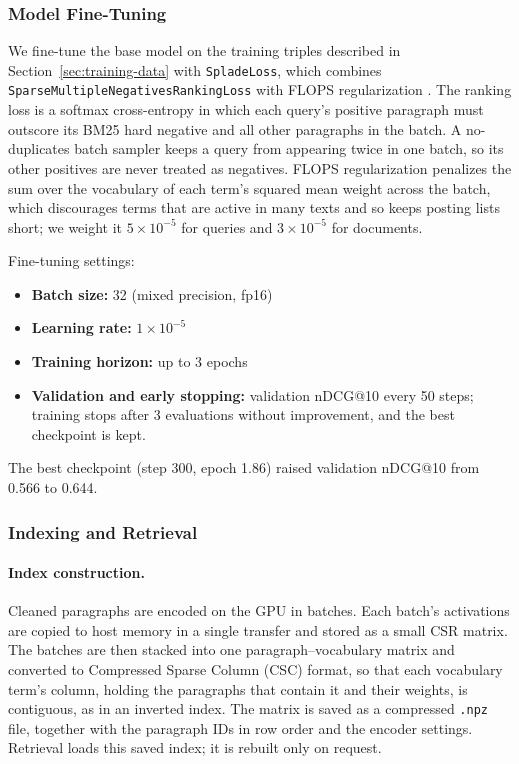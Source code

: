 \documentclass[sigconf,nonacm]{acmart}
\begin{document}
\subsubsection{Model Fine-Tuning}
We fine-tune the base model on the training triples described in
Section~\ref{sec:training-data} with \texttt{SpladeLoss}, which combines
\texttt{SparseMultipleNegativesRankingLoss} with FLOPS regularization
\cite{paria2020minimizing}. The ranking loss is a softmax cross-entropy in which each
query's positive paragraph must outscore its BM25 hard negative and all other paragraphs
in the batch. A no-duplicates batch sampler keeps a query from appearing twice in one
batch, so its other positives are never treated as negatives. FLOPS regularization
penalizes the sum over the vocabulary of each term's squared mean weight across the batch,
which discourages terms that are active in many texts and so keeps posting lists short;
we weight it $5 \times 10^{-5}$ for queries and $3 \times 10^{-5}$ for documents.


Fine-tuning settings:
\begin{itemize}
    \item \textbf{Batch size:} 32 (mixed precision, fp16)
    \item \textbf{Learning rate:} $1 \times 10^{-5}$
    \item \textbf{Training horizon:} up to 3 epochs
    \item \textbf{Validation and early stopping:} validation nDCG@10 every 50 steps; training
          stops after 3 evaluations without improvement, and the best checkpoint is kept.
\end{itemize}
The best checkpoint (step 300, epoch 1.86) raised validation nDCG@10 from 0.566 to 0.644.


\subsubsection{Indexing and Retrieval}
\paragraph{Index construction.}
Cleaned paragraphs are encoded on the GPU in batches.
Each batch's activations are copied to host memory in a single transfer and stored as a
small CSR matrix. The batches are then stacked into one paragraph--vocabulary
matrix and converted to Compressed Sparse Column (CSC) format, so that each vocabulary
term's column, holding the paragraphs that contain it and their weights, is contiguous, as
in an inverted index. The matrix is saved as a compressed \texttt{.npz} file, together
with the paragraph IDs in row order and the encoder settings. Retrieval loads this saved
index; it is rebuilt only on request.
\end{document}
